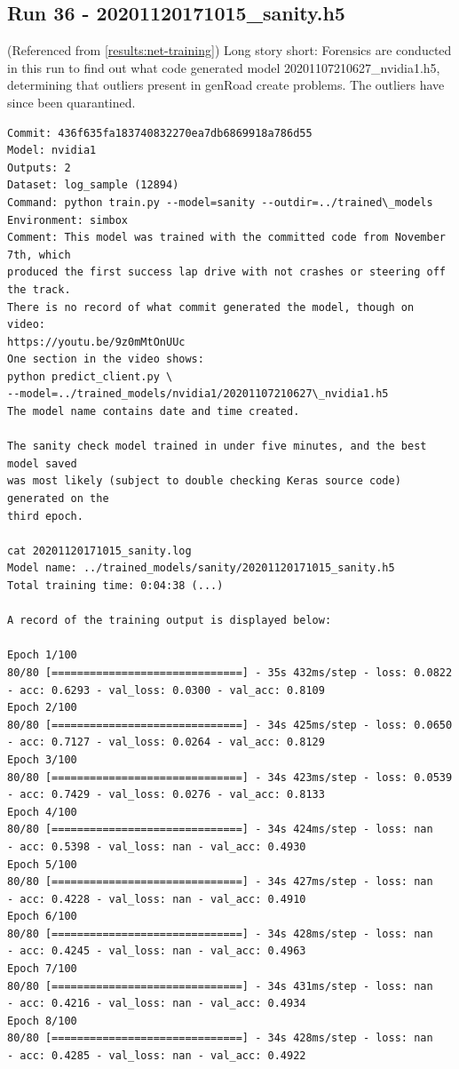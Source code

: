 \subsection{Run 36 - 20201120171015\_sanity.h5}
(Referenced from \ref{results:net-training})
Long story short: Forensics are conducted in this run to find out what code generated model 
20201107210627\_nvidia1.h5, determining that outliers present in genRoad create problems. The outliers have since been quarantined.

\label{app_res:36}

\begin{verbatim}
Commit: 436f635fa183740832270ea7db6869918a786d55
Model: nvidia1
Outputs: 2
Dataset: log_sample (12894) 
Command: python train.py --model=sanity --outdir=../trained\_models
Environment: simbox
Comment: This model was trained with the committed code from November 7th, which
produced the first success lap drive with not crashes or steering off the track.
There is no record of what commit generated the model, though on video:
https://youtu.be/9z0mMtOnUUc
One section in the video shows:
python predict_client.py \
--model=../trained_models/nvidia1/20201107210627\_nvidia1.h5
The model name contains date and time created.

The sanity check model trained in under five minutes, and the best model saved 
was most likely (subject to double checking Keras source code) generated on the
third epoch.

cat 20201120171015_sanity.log
Model name: ../trained_models/sanity/20201120171015_sanity.h5
Total training time: 0:04:38 (...)

A record of the training output is displayed below:

Epoch 1/100
80/80 [==============================] - 35s 432ms/step - loss: 0.0822 
- acc: 0.6293 - val_loss: 0.0300 - val_acc: 0.8109
Epoch 2/100
80/80 [==============================] - 34s 425ms/step - loss: 0.0650 
- acc: 0.7127 - val_loss: 0.0264 - val_acc: 0.8129
Epoch 3/100
80/80 [==============================] - 34s 423ms/step - loss: 0.0539 
- acc: 0.7429 - val_loss: 0.0276 - val_acc: 0.8133
Epoch 4/100
80/80 [==============================] - 34s 424ms/step - loss: nan 
- acc: 0.5398 - val_loss: nan - val_acc: 0.4930
Epoch 5/100
80/80 [==============================] - 34s 427ms/step - loss: nan 
- acc: 0.4228 - val_loss: nan - val_acc: 0.4910
Epoch 6/100
80/80 [==============================] - 34s 428ms/step - loss: nan 
- acc: 0.4245 - val_loss: nan - val_acc: 0.4963
Epoch 7/100
80/80 [==============================] - 34s 431ms/step - loss: nan 
- acc: 0.4216 - val_loss: nan - val_acc: 0.4934
Epoch 8/100
80/80 [==============================] - 34s 428ms/step - loss: nan 
- acc: 0.4285 - val_loss: nan - val_acc: 0.4922


\end{verbatim}
